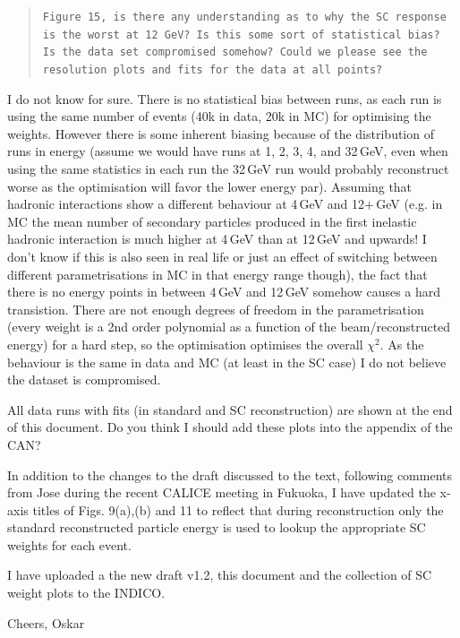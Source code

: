 \documentclass[twoside,a4paper,12pt]{article}
\begin{document}
\begin{quote}\texttt{Figure 15, is there any understanding as to why the SC response is the worst  at 12 GeV?  Is this some sort of statistical bias? Is the data set compromised somehow?   Could we please see the resolution plots and fits for the data at all points?}\end{quote}
I do not know for sure. There is no statistical bias between runs, as each run is using the same number of events (40k in data, 20k in MC) for optimising the weights. However there is some inherent biasing because of the distribution of runs in energy (assume we would have runs at 1, 2, 3, 4, and 32\,GeV, even when using the same statistics in each run the 32\,GeV run would probably reconstruct worse as the optimisation will favor the lower energy par). Assuming that hadronic interactions show a different behaviour at 4\,GeV and 12+\,GeV (e.g. in MC the mean number of secondary particles produced in the first inelastic hadronic interaction is much higher at 4\,GeV than at 12\,GeV and upwards! I don't know if this is also seen in real life or just an effect of switching between different parametrisations in MC in that energy range though), the fact that there is no energy points in between 4\,GeV and 12\,GeV somehow causes a hard transistion. There are not enough degrees of freedom in the parametrisation (every weight is a 2nd order polynomial as a function of the beam/reconstructed energy) for a hard step, so the optimisation optimises the overall $\chi^2$. As the behaviour is the same in data and MC (at least in the SC case) I do not believe the dataset is compromised.

All data runs with fits (in standard and SC reconstruction) are shown at the end of this document. Do you think I should add these plots into the appendix of the CAN?

In addition to the changes to the draft discussed to the text, following comments from Jose during the recent CALICE meeting in Fukuoka, I have updated the x-axis titles of Figs. 9(a),(b) and 11 to reflect that during reconstruction only the standard reconstructed particle energy is used to lookup the appropriate SC weights for each event. 

I have uploaded a the new draft v1.2, this document and the collection of SC weight plots to the INDICO.

Cheers,
Oskar
\end{document}
